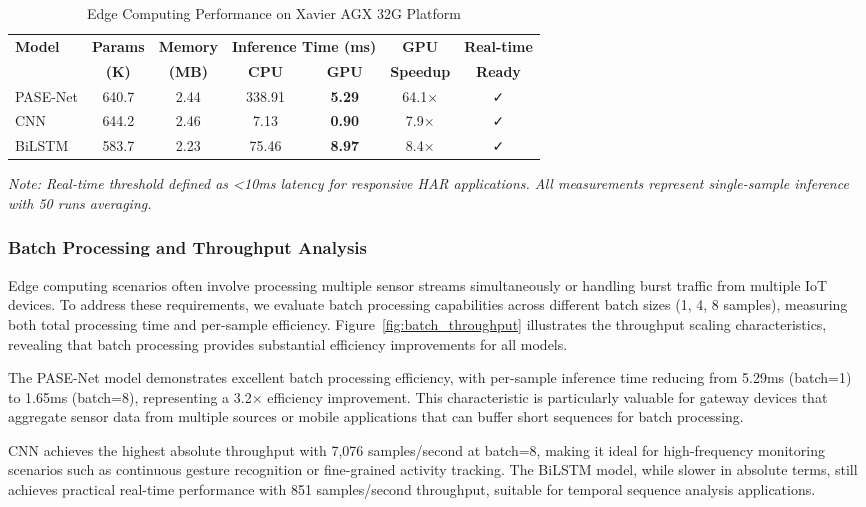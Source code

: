 \begin{table}[t]
\centering
\caption{Edge Computing Performance on Xavier AGX 32G Platform}
\label{tab:edge_performance}
\small
\begin{tabular}{@{}lcccccc@{}}
\toprule
\textbf{Model} & \textbf{Params} & \textbf{Memory} & \multicolumn{2}{c}{\textbf{Inference Time (ms)}} & \textbf{GPU} & \textbf{Real-time} \\
 & \textbf{(K)} & \textbf{(MB)} & \textbf{CPU} & \textbf{GPU} & \textbf{Speedup} & \textbf{Ready} \\
\midrule
PASE-Net & 640.7 & 2.44 & 338.91 & \textbf{5.29} & 64.1× & ✓ \\
CNN & 644.2 & 2.46 & 7.13 & \textbf{0.90} & 7.9× & ✓ \\
BiLSTM & 583.7 & 2.23 & 75.46 & \textbf{8.97} & 8.4× & ✓ \\
\bottomrule
\end{tabular}
\end{table}
\textit{Note: Real-time threshold defined as <10ms latency for responsive HAR applications. All measurements represent single-sample inference with 50 runs averaging.}

\subsubsection{Batch Processing and Throughput Analysis}

Edge computing scenarios often involve processing multiple sensor streams simultaneously or handling burst traffic from multiple IoT devices. To address these requirements, we evaluate batch processing capabilities across different batch sizes (1, 4, 8 samples), measuring both total processing time and per-sample efficiency. Figure~\ref{fig:batch_throughput} illustrates the throughput scaling characteristics, revealing that batch processing provides substantial efficiency improvements for all models.

The PASE-Net model demonstrates excellent batch processing efficiency, with per-sample inference time reducing from 5.29ms (batch=1) to 1.65ms (batch=8), representing a 3.2× efficiency improvement. This characteristic is particularly valuable for gateway devices that aggregate sensor data from multiple sources or mobile applications that can buffer short sequences for batch processing.

CNN achieves the highest absolute throughput with 7,076 samples/second at batch=8, making it ideal for high-frequency monitoring scenarios such as continuous gesture recognition or fine-grained activity tracking. The BiLSTM model, while slower in absolute terms, still achieves practical real-time performance with 851 samples/second throughput, suitable for temporal sequence analysis applications.

